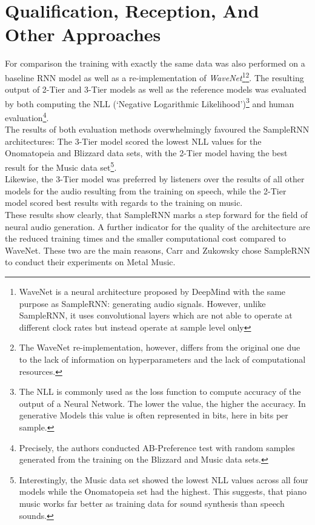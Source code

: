 \documentclass[a4paper, 11pt]{report}
\begin{document}
\section{Qualification, Reception, And Other Approaches}
For comparison the training with exactly the same data was also performed on a 
baseline RNN model as well as a re-implementation of \textit{WaveNet}\footnote{
    WaveNet is a neural architecture proposed by DeepMind with the same purpose 
    as SampleRNN: generating audio signals. However, unlike SampleRNN, it uses 
    convolutional layers which are not able to operate at different clock rates 
    but instead operate at sample level only\cite{van2016wavenet}
}\footnote{
    The WaveNet re-implementation, however, differs from the original one due 
    to the lack of information on hyperparameters and the lack of computational 
    resources.
}. The resulting 
output of 2-Tier and 3-Tier models as well as the reference models was evaluated 
by both computing the NLL (‘Negative Logarithmic Likelihood’)\footnote{
    The NLL is commonly used as the loss function to compute accuracy of the 
    output of a Neural Network. The lower the value, the higher the accuracy. 
    In generative Models this value is often represented in bits, here in bits 
    per sample.
} and human evaluation\footnote{
    Precisely, the authors conducted AB-Preference test with random samples 
    generated from the training on the Blizzard and Music data sets.
}. \\
The results of both evaluation methods overwhelmingly favoured the SampleRNN 
architectures: The 3-Tier model scored the lowest NLL values for the Onomatopeia 
and Blizzard data sets, with the 2-Tier model having the best result for the 
Music data set\footnote{Interestingly, the Music data set showed the lowest 
NLL values across all four models while the Onomatopeia set had the highest. 
This suggests, that piano music works far better as training data for sound 
synthesis than speech sounds.  
}. \\
Likewise, the 3-Tier model was preferred by listeners over the results of all other 
models for the audio resulting from the training on speech, while the 2-Tier model 
scored best results with regards to the training on music. \\
These results show clearly, that SampleRNN marks a step forward for the field of 
neural audio generation. A further indicator for the quality of the architecture 
are the reduced training times and the smaller computational cost compared to 
WaveNet. These two are the main reasons, Carr and Zukowsky chose SampleRNN to 
conduct their experiments on Metal Music. \\
\end{document}
